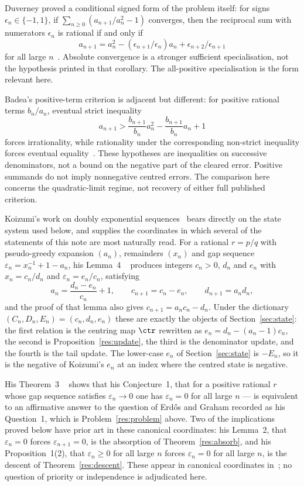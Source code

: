 Duverney proved a
conditional signed form of the problem itself: for signs
$\epsilon_n\in\{-1,1\}$, if
$\sum_{n\ge0}(a_{n+1}/a_n^{2}-1)$ converges, then the reciprocal sum with
numerators $\epsilon_n$ is rational if and only if
\[
 a_{n+1}=a_n^2-(\epsilon_{n+1}/\epsilon_n)a_n
             +\epsilon_{n+2}/\epsilon_{n+1}
\]
for all large $n$~\cite[Corollary~3.2, p.~287]{duverney2001}.  Absolute
convergence is a stronger sufficient specialisation, not the hypothesis
printed in that corollary.  The all-positive specialisation is the form
relevant here.

Badea's positive-term criterion is adjacent but different:
for positive rational terms $b_n/a_n$, eventual strict inequality
\[
 a_{n+1}>\frac{b_{n+1}}{b_n}a_n^2-\frac{b_{n+1}}{b_n}a_n+1
\]
forces irrationality, while rationality under the corresponding non-strict
inequality forces eventual equality~\cite[Theorem~A, p.~313; Cor.~2.2,
p.~316]{badea1993}.  These hypotheses are inequalities on successive denominators, not a bound on
the negative part of the cleared error.  Positive summands do not imply
nonnegative centred errors.  The comparison here concerns the quadratic-limit
regime, not recovery of either full published criterion.

Koizumi's work on doubly exponential sequences~\cite{koizumi2025} bears
directly on the state system used below, and supplies the coordinates in which
several of the statements of this note are most naturally read.  For a rational
$r=p/q$ with pseudo-greedy expansion $(a_n)$, remainders $(x_n)$ and gap
sequence $\varepsilon_n=x_n^{-1}+1-a_n$, his Lemma~4
~\cite[p.~11]{koizumi2025} produces integers $c_n>0$,
$d_n$ and $e_n$ with $x_n=c_n/d_n$ and $\varepsilon_n=e_n/c_n$, satisfying
\[
 a_n=\frac{d_n-e_n}{c_n}+1,\qquad
 c_{n+1}=c_n-e_n,\qquad
 d_{n+1}=a_nd_n ,
\]
and the proof of that lemma also gives $c_{n+1}=a_nc_n-d_n$.  Under the
dictionary $(C_n,D_n,E_n)=(c_n,d_n,e_n)$ these are exactly the objects of
Section~\ref{sec:state}: the first relation is the centring map $\ctr$ rewritten
as $e_n=d_n-(a_n-1)c_n$, the second is Proposition~\ref{res:update}, the third
is the denominator update, and the fourth is the tail update.  The lower-case
$e_n$ of Section~\ref{sec:state} is $-E_n$, so it is the negative of Koizumi's
$e_n$ at an index where the centred state is negative.

His Theorem~3
~\cite[pp.~12--13]{koizumi2025} shows
that his Conjecture~1, that for a positive rational $r$ whose gap sequence
satisfies $\varepsilon_n\to0$ one has $\varepsilon_n=0$ for all large $n$ ---
is equivalent to an affirmative answer to the question of Erd\H{o}s and Graham
recorded as his Question~1, which is Problem~\ref{res:problem} above.
Two of the implications proved below have prior art in these canonical
coordinates: his Lemma~2, that $\varepsilon_n=0$ forces $\varepsilon_{n+1}=0$,
is the absorption of Theorem~\ref{res:absorb}, and his Proposition~1(2), that
$\varepsilon_n\ge0$ for all large $n$ forces $\varepsilon_n=0$ for all large
$n$, is the descent of Theorem~\ref{res:descent}.  These appear in canonical
coordinates in~\cite[Lemma~2, p.~10; Prop.~1(2), p.~14]{koizumi2025}; no
question of priority or independence is
adjudicated here.

